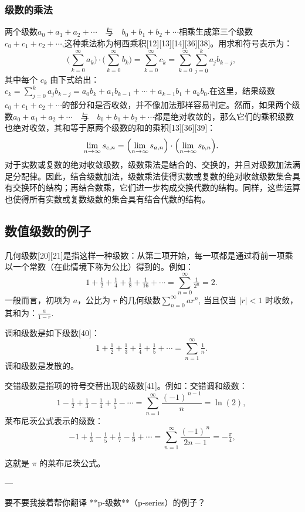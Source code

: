 \subsubsection{级数的乘法}
两个级数$a_{0} + a_{1} + a_{2} + \cdots \quad \text{与} \quad b_{0} + b_{1} + b_{2} + \cdots$相乘生成第三个级数$c_{0} + c_{1} + c_{2} + \cdots$,这种乘法称为柯西乘积[12][13][14][36][38]。用求和符号表示为：
$$
\Biggl(\sum_{k=0}^{\infty} a_{k}\Biggr) \cdot \Biggl(\sum_{k=0}^{\infty} b_{k}\Biggr) 
= \sum_{k=0}^{\infty} c_{k} 
= \sum_{k=0}^{\infty} \sum_{j=0}^{k} a_{j} b_{k-j},~
$$
其中每个 $c_{k}$ 由下式给出：$c_{k} = \sum_{j=0}^{k} a_{j} b_{k-j} = a_{0} b_{k} + a_{1} b_{k-1} + \cdots + a_{k-1} b_{1} + a_{k} b_{0}.$在这里，结果级数$c_{0} + c_{1} + c_{2} + \cdots$的部分和是否收敛，并不像加法那样容易判定。然而，如果两个级数$a_{0} + a_{1} + a_{2} + \cdots \quad \text{与} \quad b_{0} + b_{1} + b_{2} + \cdots$都是绝对收敛的，那么它们的乘积级数也绝对收敛，其和等于原两个级数的和的乘积[13][36][39]：
$$
\lim_{n \to \infty} s_{c,n} 
= \Bigl(\lim_{n \to \infty} s_{a,n}\Bigr) \cdot \Bigl(\lim_{n \to \infty} s_{b,n}\Bigr).~
$$
对于实数或复数的绝对收敛级数，级数乘法是结合的、交换的，并且对级数加法满足分配律。因此，结合级数加法，级数乘法使得实数或复数的绝对收敛级数集合具有交换环的结构；再结合数乘，它们进一步构成交换代数的结构。同样，这些运算也使得所有实数或复数级数的集合具有结合代数的结构。
\subsection{数值级数的例子}
几何级数[20][21]是指这样一种级数：从第二项开始，每一项都是通过将前一项乘以一个常数（在此情境下称为公比）得到的。例如：
$$
1 + \tfrac{1}{2} + \tfrac{1}{4} + \tfrac{1}{8} + \tfrac{1}{16} + \cdots 
= \sum_{n=0}^{\infty} \tfrac{1}{2^{n}} = 2.~
$$
一般而言，初项为 $a$，公比为 $r$ 的几何级数$\sum_{n=0}^{\infty} ar^{n}$,
当且仅当 $|r| < 1$ 时收敛，其和为：$\frac{a}{1-r}$.



调和级数是如下级数[40]：
$$
1 + \tfrac{1}{2} + \tfrac{1}{3} + \tfrac{1}{4} + \tfrac{1}{5} + \cdots 
= \sum_{n=1}^{\infty} \tfrac{1}{n}.~
$$
调和级数是发散的。

交错级数是指项的符号交替出现的级数[41]。例如：交错调和级数：
$$
1 - \tfrac{1}{2} + \tfrac{1}{3} - \tfrac{1}{4} + \tfrac{1}{5} - \cdots 
= \sum_{n=1}^{\infty} \frac{(-1)^{\,n-1}}{n} = \ln(2),~
$$
莱布尼茨公式表示的级数：
$$
-1 + \tfrac{1}{3} - \tfrac{1}{5} + \tfrac{1}{7} - \tfrac{1}{9} + \cdots 
= \sum_{n=1}^{\infty} \frac{(-1)^{\,n}}{2n-1} = -\tfrac{\pi}{4},
$$

这就是 $\pi$ 的莱布尼茨公式。

---

要不要我接着帮你翻译 **p-级数**（p-series）的例子？
